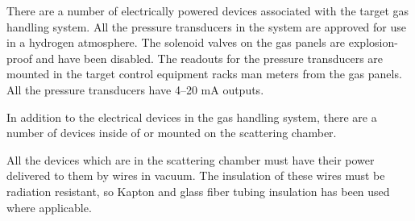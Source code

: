 \begin{safetyen}{0}{0}
{There are a number of electrically powered devices associated with
the target gas handling system. All the pressure transducers in the
system are approved for use in a hydrogen atmosphere. The solenoid
valves on the gas panels are explosion-proof and have been disabled.
The readouts for the pressure transducers are mounted in the target
control equipment racks man meters from the gas panels. All the pressure
transducers have 4--20 mA outputs.

In addition to the electrical devices in the gas handling system,
there are a number of devices inside of or mounted on the scattering
chamber.

All the devices which are in the scattering chamber must have their
power delivered to them by wires in vacuum. The insulation of these
wires must be radiation resistant, so Kapton and glass fiber tubing
insulation has been used where applicable.

}
\end{safetyen}
